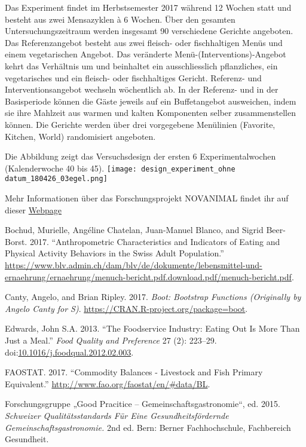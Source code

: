 \documentclass[]{book}
\begin{document}
Das Experiment findet im Herbstsemester 2017 während 12 Wochen statt und
besteht aus zwei Mensazyklen à 6 Wochen. Über den gesamten
Untersuchungszeitraum werden insgesamt 90 verschiedene Gerichte
angeboten. Das Referenzangebot besteht aus zwei fleisch- oder
fischhaltigen Menüs und einem vegetarischen Angebot. Das veränderte
Menü-(Interventions)-Angebot kehrt das Verhältnis um und beinhaltet ein
ausschliesslich pflanzliches, ein vegetarisches und ein fleisch- oder
fischhaltiges Gericht. Referenz- und Interventionsangebot wechseln
wöchentlich ab. In der Referenz- und in der Basisperiode können die
Gäste jeweils auf ein Buffetangebot ausweichen, indem sie ihre Mahlzeit
aus warmen und kalten Komponenten selber zusammenstellen können. Die
Gerichte werden über drei vorgegebene Menülinien (Favorite, Kitchen,
World) randomisiert angeboten.

Die Abbildung zeigt das Versuchsdesign der ersten 6 Experimentalwochen
(Kalenderwoche 40 bis 45).
\texttt{[image: design\_experiment\_ohne datum\_180426\_03egel.png]}

Mehr Informationen über das Forschungsprojekt NOVANIMAL findet ihr auf
dieser \href{https://www.novanimal.ch}{Webpage}

\hypertarget{refs}{}
\hypertarget{ref-bochud_anthropometric_2017}{}
Bochud, Murielle, Angéline Chatelan, Juan-Manuel Blanco, and Sigrid
Beer-Borst. 2017. ``Anthropometric Characteristics and Indicators of
Eating and Physical Activity Behaviors in the Swiss Adult Population.''
\url{https://www.blv.admin.ch/dam/blv/de/dokumente/lebensmittel-und-ernaehrung/ernaehrung/menuch-bericht.pdf.download.pdf/menuch-bericht.pdf}.

\hypertarget{ref-R-boot}{}
Canty, Angelo, and Brian Ripley. 2017. \emph{Boot: Bootstrap Functions
(Originally by Angelo Canty for S)}.
\url{https://CRAN.R-project.org/package=boot}.

\hypertarget{ref-edwards_foodservice_2013}{}
Edwards, John S.A. 2013. ``The Foodservice Industry: Eating Out Is More
Than Just a Meal.'' \emph{Food Quality and Preference} 27 (2): 223--29.
doi:\href{https://doi.org/10.1016/j.foodqual.2012.02.003}{10.1016/j.foodqual.2012.02.003}.

\hypertarget{ref-food_and_agriculture_organization_of_the_united_nations_statistics_faostat_commodity_2017}{}
FAOSTAT. 2017. ``Commodity Balances - Livestock and Fish Primary
Equivalent.'' \url{http://www.fao.org/faostat/en/\#data/BL}.

\hypertarget{ref-forschungsgruppe_good_pracitice__gemeinschaftsgastronomie_schweizer_2015}{}
Forschungsgruppe „Good Pracitice -- Gemeinschaftsgastronomie``, ed.
2015. \emph{Schweizer Qualitätsstandards Für Eine Gesundheitsfördernde
Gemeinschaftsgastronomie.} 2nd ed. Bern: Berner Fachhochschule,
Fachbereich Gesundheit.
\end{document}
